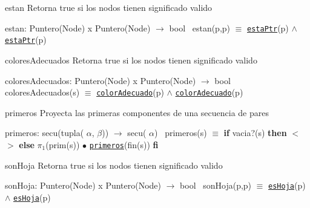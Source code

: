 \begin{DoxyParagraph}{estan}
Retorna true si los nodos tienen significado valido

estan\+: Puntero(\+Node) x Puntero(\+Node) $\to$ bool~\newline
 estan(p,p\textquotesingle{}) $\equiv$ \href{axiomas.html#estaPtr}{\tt esta\+Ptr}(p) $\land$ \href{axiomas.html#estaPtr}{\tt esta\+Ptr}(p\textquotesingle{}) 
\end{DoxyParagraph}


\begin{DoxyParagraph}{colores\+Adecuados}
Retorna true si los nodos tienen significado valido

colores\+Adecuados\+: Puntero(\+Node) x Puntero(\+Node) $\to$ bool~\newline
 colores\+Adecuados(s) $\equiv$ \href{axiomas.html#colorAdecuado}{\tt color\+Adecuado}(p) $\land$ \href{axiomas.html#colorAdecuado}{\tt color\+Adecuado}(p\textquotesingle{}) 
\end{DoxyParagraph}


\begin{DoxyParagraph}{primeros}
Proyecta las primeras componentes de una secuencia de pares

primeros\+: secu(tupla( $\alpha$, $\beta$)) $\to$ secu( $\alpha$)~\newline
 primeros(s) $\equiv$ {\bfseries if} vacia?(s) {\bfseries then} $<$$>$ {\bfseries else} $\pi_1$(prim(s)) $\bullet$ \href{axiomas.html#primeros}{\tt primeros}(fin(s)) {\bfseries fi} 
\end{DoxyParagraph}


\begin{DoxyParagraph}{son\+Hoja}
Retorna true si los nodos tienen significado valido

son\+Hoja\+: Puntero(\+Node) x Puntero(\+Node) $\to$ bool~\newline
 son\+Hoja(p,p\textquotesingle{}) $\equiv$ \href{axiomas.html#esHoja}{\tt es\+Hoja}(p) $\land$ \href{axiomas.html#esHoja}{\tt es\+Hoja}(p\textquotesingle{}) 
\end{DoxyParagraph}


